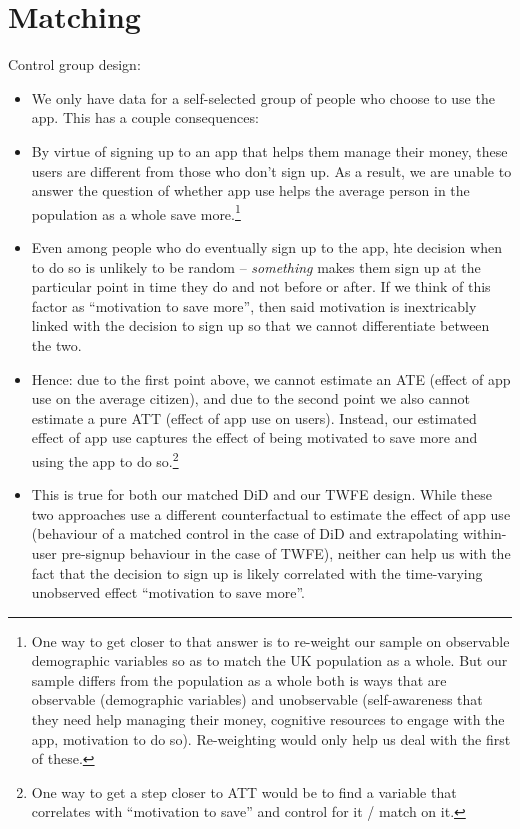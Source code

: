 \section{Matching}%
\label{sub:alternative_matching_method}

Control group design:
\begin{itemize}

    \item We only have data for a self-selected group of people who choose to
        use the app. This has a couple consequences:

    \item By virtue of signing up to an app that helps them manage
        their money, these users are different from those who don't
        sign up. As a result, we are unable to answer the question of
        whether app use helps the average person in the
        population as a whole save more.\footnote{One way to get closer
            to that answer is to re-weight our sample on observable
            demographic variables so as to match the UK population as a
            whole. But our sample differs from the population as a
            whole both is ways that are observable (demographic
            variables) and unobservable (self-awareness that they need
            help managing their money, cognitive resources to engage
            with the app, motivation to do so). Re-weighting would only
            help us deal with the first of these.}

    \item Even among people who do eventually sign up to the app,
        hte decision when to do so is unlikely to be random --
        \textit{something} makes them sign up at the particular
        point in time they do and not before or after. If we think
        of this factor as ``motivation to save more'', then said
        motivation is inextricably linked with the decision to sign
        up so that we cannot differentiate between the two.

    \item Hence: due to the first point above, we cannot estimate
        an ATE (effect of app use on the average citizen), and due
        to the second point we also cannot estimate a pure ATT
        (effect of app use on users). Instead, our estimated effect
        of app use captures the effect of being motivated to save
        more and using the app to do so.\footnote{One way to get a
            step closer to ATT would be to find a variable that
        correlates with ``motivation to save'' and control for it /
    match on it.}

    \item This is true for both our matched DiD and our TWFE
        design. While these two approaches use a different
        counterfactual to estimate the effect of app use
        (behaviour of a matched control in the case of DiD and
        extrapolating within-user pre-signup behaviour in the case
        of TWFE), neither can help us with the fact that the
        decision to sign up is likely correlated with the
        time-varying unobserved effect ``motivation to save more''.

\end{itemize}

